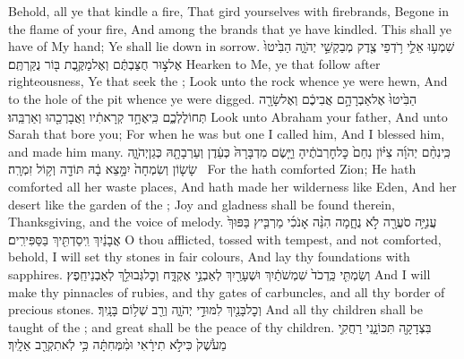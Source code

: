{Behold, all ye that kindle a fire, That gird yourselves with firebrands, Begone in the flame of your fire, And among the brands that ye have kindled. This shall ye have of My hand; Ye shall lie down in sorrow.}
\newperek
{}
{שִׁמְע֥וּ אֵלַ֛י רֹ֥דְפֵי צֶ֖דֶק מְבַקְשֵׁ֣י יְהֹוָ֑ה הַבִּ֙יטוּ֙ אֶל\maqqaf צ֣וּר חֻצַּבְתֶּ֔ם וְאֶל\maqqaf מַקֶּ֥בֶת בּ֖וֹר נֻקַּרְתֶּֽם׃}
{Hearken to Me, ye that follow after righteousness, Ye that seek the \lord; Look unto the rock whence ye were hewn, And to the hole of the pit whence ye were digged.}
{הַבִּ֙יטוּ֙ אֶל\maqqaf אַבְרָהָ֣ם אֲבִיכֶ֔ם וְאֶל\maqqaf שָׂרָ֖ה תְּחוֹלֶלְכֶ֑ם כִּֽי\maqqaf אֶחָ֣ד קְרָאתִ֔יו וַאֲבָרְכֵ֖הוּ וְאַרְבֵּֽהוּ׃}
{Look unto Abraham your father, And unto Sarah that bore you; For when he was but one I called him, And I blessed him, and made him many.}
{כִּֽי\maqqaf נִחַ֨ם יְהֹוָ֜ה צִיּ֗וֹן נִחַם֙ כׇּל\maqqaf חׇרְבֹתֶ֔יהָ וַיָּ֤שֶׂם מִדְבָּרָהּ֙ כְּעֵ֔דֶן וְעַרְבָתָ֖הּ כְּגַן\maqqaf יְהֹוָ֑ה שָׂשׂ֤וֹן וְשִׂמְחָה֙ יִמָּ֣צֵא בָ֔הּ תּוֹדָ֖ה וְק֥וֹל זִמְרָֽה׃ \setuma }
{For the \lord\space hath comforted Zion; He hath comforted all her waste places, And hath made her wilderness like Eden, And her desert like the garden of the \lord; Joy and gladness shall be found therein, Thanksgiving, and the voice of melody.}
\newperek
{}
\label{haft_47}
\setcounter{chap}{54}
\setcounter{verse}{11}
{עֲנִיָּ֥ה סֹעֲרָ֖ה לֹ֣א נֻחָ֑מָה הִנֵּ֨ה אָנֹכִ֜י מַרְבִּ֤יץ בַּפּוּךְ֙ אֲבָנַ֔יִךְ וִֽיסַדְתִּ֖יךְ בַּסַּפִּירִֽים׃}
{O thou afflicted, tossed with tempest, and not comforted, behold, I will set thy stones in fair colours, And lay thy foundations with sapphires.}
{וְשַׂמְתִּ֤י כַּֽדְכֹד֙ שִׁמְשֹׁתַ֔יִךְ וּשְׁעָרַ֖יִךְ לְאַבְנֵ֣י אֶקְדָּ֑ח וְכׇל\maqqaf גְּבוּלֵ֖ךְ לְאַבְנֵי\maqqaf חֵֽפֶץ׃}
{And I will make thy pinnacles of rubies, and thy gates of carbuncles, and all thy border of precious stones.}
{וְכׇל\maqqaf בָּנַ֖יִךְ לִמּוּדֵ֣י יְהֹוָ֑ה וְרַ֖ב שְׁל֥וֹם בָּנָֽיִךְ׃}
{And all thy children shall be taught of the \lord; and great shall be the peace of thy children.}
{בִּצְדָקָ֖ה תִּכּוֹנָ֑נִי רַחֲקִ֤י מֵעֹ֙שֶׁק֙ כִּי\maqqaf לֹ֣א תִירָ֔אִי וּמִ֨מְּחִתָּ֔ה כִּ֥י לֹֽא\maqqaf תִקְרַ֖ב אֵלָֽיִךְ׃}

